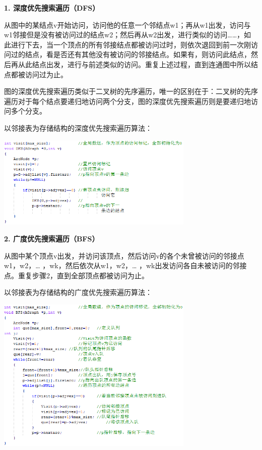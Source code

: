 {\textbf{1. 深度优先搜索遍历（DFS）}}

{从图中的某结点v开始访问，访问他的任意一个邻结点w1；再从w1出发，访问与w1邻接但是没有被访问过的结点w2；然后再从w2出发，进行类似的访问\ldots{}\ldots{}，如此进行下去，当一个顶点的所有邻接结点都被访问过时，则依次退回到前一次刚访问过的结点，看是否还有其他没有被访问的邻接结点。如果有，则访问此结点，然后再从此结点出发，进行与前述类似的访问。重复上述过程，直到连通图中所以结点都被访问过为止。}

{图的深度优先搜索遍历类似于二叉树的先序遍历，唯一的区别在于：{二叉树的先序遍历对于每个结点要递归地访问两个分支，图的深度优先搜索遍历则是要递归地访问多个分支。}}

{以邻接表为存储结构的深度优先搜索遍历算法：}

\includegraphics[width=3.70833in,height=1.73958in]{png-jpeg-pics/707E925EDD4194753E9B149C6EFC6D8E.png}

{\textbf{2. 广度优先搜索遍历（BFS）}}

{从图中某个顶点v出发，并访问该顶点，然后访问v的各个未曾被访问的邻接点w1，w2，\ldots{}
，wk，然后依次从w1，w2，\ldots{}
，wk出发访问各自未被访问的邻接点。重复步骤2，直到全部顶点都被访问为止。}

{以邻接表为存储结构的广度优先搜索遍历算法：}

\includegraphics[width=3.70833in,height=2.91667in]{png-jpeg-pics/7BFE384E1625FF63709604A860D8BAAF.png}
